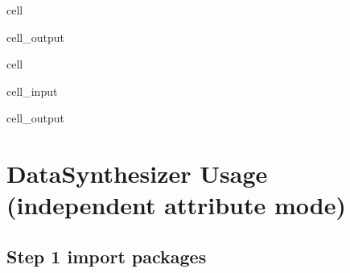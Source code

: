 \documentclass[letterpaper,10pt,english]{jupyterBook}
\begin{document}
\begin{sphinxuseclass}{cell}
\begin{sphinxVerbatimOutput}
\begin{sphinxuseclass}{cell_output}
\noindent{}

\noindent{}

\noindent{}

\noindent{}

\noindent{}

\noindent{}

\end{sphinxuseclass}\end{sphinxVerbatimOutput}

\end{sphinxuseclass}
\begin{sphinxuseclass}{cell}\begin{sphinxVerbatimInput}

\begin{sphinxuseclass}{cell_input}
\begin{sphinxVerbatim}[commandchars=\\\{\}]
\end{sphinxVerbatim}

\end{sphinxuseclass}\end{sphinxVerbatimInput}
\begin{sphinxVerbatimOutput}

\begin{sphinxuseclass}{cell_output}
\noindent{}

\end{sphinxuseclass}\end{sphinxVerbatimOutput}

\end{sphinxuseclass}

\chapter{DataSynthesizer Usage (independent attribute mode)}
\label{\detokenize{src/test/SynthNAV0:datasynthesizer-usage-independent-attribute-mode}}

\section{Step 1 import packages}
\label{\detokenize{src/test/SynthNAV0:id1}}
\end{document}
